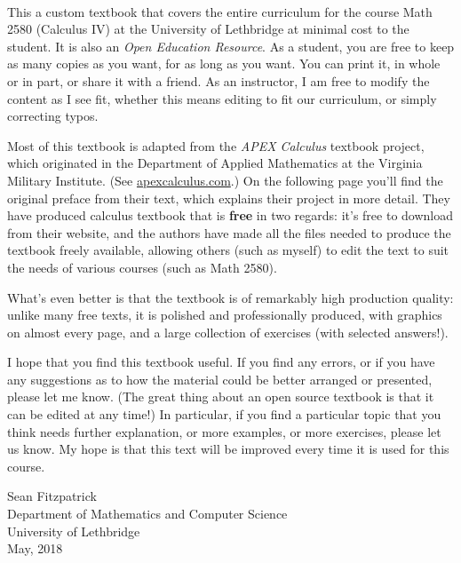 \thispagestyle{empty}
\Huge
{}\\
\normalsize

This a custom textbook that covers the entire curriculum  for the course Math 2580 (Calculus IV) at the University of Lethbridge at minimal cost to the student. It is also an \emph{Open Education Resource}. As a student, you are free to keep as many copies as you want, for as long as you want. You can print it, in whole or in part, or share it with a friend. As an instructor, I am free to modify the content as I see fit, whether this means editing to fit our curriculum, or simply correcting typos.


Most of this textbook is adapted from the \textit{APEX Calculus} textbook project, which originated in the Department of Applied Mathematics at the Virginia Military Institute. (See \href{http://www.apexcalculus.com}{apexcalculus.com}.) On the following page you'll find the original preface from their text, which explains their project in more detail. They have produced calculus textbook that is \textbf{free} in two regards: it's free to  download from their website, and the authors have made all the files needed to produce the textbook freely available, allowing others (such as myself) to edit the text to suit the needs of various courses (such as Math 2580).

What's even better is that the textbook is of remarkably high production quality: unlike many free texts, it is polished and professionally produced, with graphics on almost every page, and a large collection of exercises (with selected answers!). 

I hope that you find this textbook useful. If you find any errors, or if you have any suggestions as to how the material could be better arranged or presented, please let me know. (The great thing about an open source textbook is that it can be edited at any time!) In particular, if you find a particular topic that you think needs further explanation, or more examples, or more exercises, please let us know. My hope is that this text will be improved every time it is used for this course.

\vspace{1in}

\begin{flushright}
Sean Fitzpatrick\\
Department of Mathematics and Computer Science\\
University of Lethbridge\\
May, 2018
\end{flushright}

